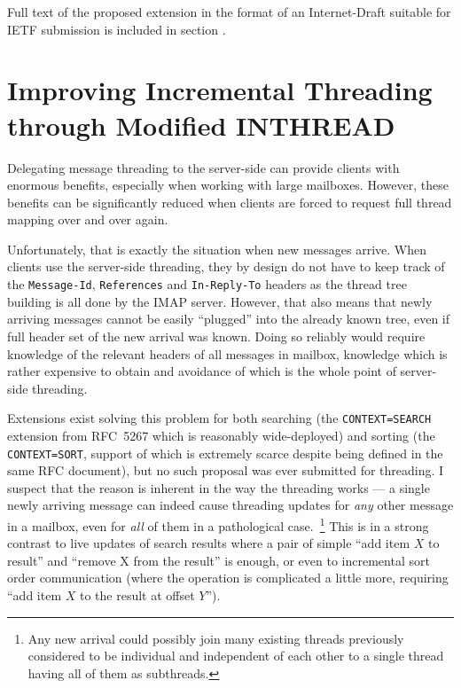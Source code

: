 \documentclass[trojita]{subfiles}
\begin{document}
Full text of the proposed extension in the format of an Internet-Draft suitable for IETF submission is included in
section .

\section{Improving Incremental Threading through Modified INTHREAD}
\label{sec:draft-incthread}

Delegating message threading to the server-side can provide clients with enormous benefits, especially when working with
large mailboxes.  However, these benefits can be significantly reduced when clients are forced to request full thread
mapping over and over again.

Unfortunately, that is exactly the situation when new messages arrive.  When clients use the server-side threading, they
by design do not have to keep track of the {\tt Message-Id}, {\tt References} and {\tt In-Reply-To} headers as the
thread tree building is all done by the IMAP server.  However, that also means that newly arriving messages cannot be
easily ``plugged'' into the already known tree, even if full header set of the new arrival was known.  Doing so reliably
would require knowledge of the relevant headers of all messages in mailbox, knowledge which is rather expensive to
obtain and avoidance of which is the whole point of server-side threading.

Extensions exist solving this problem for both searching (the {\tt CONTEXT=SEARCH} extension from RFC~5267
\cite{rfc5267} which is reasonably wide-deployed) and sorting (the {\tt CONTEXT=SORT}, support of which is extremely
scarce despite being defined in the same RFC document), but no such proposal was ever submitted for threading.  I
suspect that the reason is inherent in the way the threading works --- a single newly arriving message can indeed cause
threading updates for {\em any} other message in a mailbox, even for {\em all} of them in a pathological
case.~\footnote{Any new arrival could possibly join many existing threads previously considered to be individual and
independent of each other to a single thread having all of them as subthreads.}  This is in a strong contrast to live
updates of search results where a pair of simple ``add item $X$ to result'' and ``remove X from the result'' is enough,
or even to incremental sort order communication (where the operation is complicated a little more, requiring ``add item
$X$ to the result at offset
$Y$'').
\end{document}
